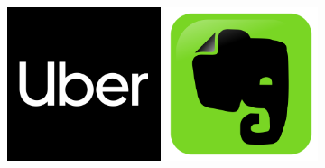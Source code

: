 \documentclass{beamer}
\begin{document}
\begin{frame}
\begin{figure}
    \centering
    \begin{minipage}{0.5\textwidth}
        \centering
        \includegraphics[width=0.4\textwidth]{pic/uber.jpg} %
    \end{minipage}\hfill
    \begin{minipage}{0.5\textwidth}
        \centering
        \includegraphics[width=0.4\textwidth]{pic/evernote.png} %
    \end{minipage}
\end{figure}

\end{frame}

\end{document}
